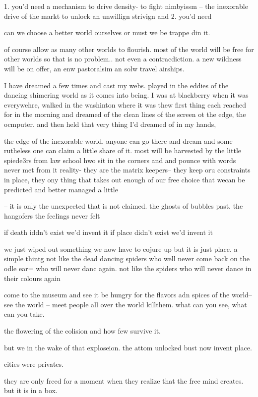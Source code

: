 1. you'd need a mechanism to drive density- to fight nimbyissm -- the inexorable drive of the markt to unlock an unwillign strivign 
and 
2. you'd need

can we choose a better world ourselves or must we be trappe din it.

of course allow as many other worlds to flourish. most of the world will be free for other worlds so that is no problem.. not even a contracdiction. a new wildness will be on offer, an enw pastoralsim an solw travel airships. 

I have dreamed a few times and cast my webs. played in the eddies of the dancing shimering world as it comes into being. I was at blackberry when it was everywehre, walked in the washinton where it was thew first thing each reached for in the morning and dreamed of the clean lines of the screen ot the edge, the ocmputer. and then held that very thing I'd dreamed of in my hands,

the edge of the inexorable world. anyone can go there and dream and some rutheless one can claim a little share of it.
most will be harvested by the little spiede3rs from law school hwo sit in the corners and and pounce with words never met from it
reality- they are the matrix keepers-- they keep oru constraints in place, they ony thing that takes out enough of our free choice that wecan be predicted and better managed a little

-- it is only the unexpected that is not claimed.
the ghosts of bubbles past.
the hangofers
the feelings never felt

if death iddn't exist we'd invent it
if place didn't exist we'd invent it

we just wiped out something we now have to cojure up but it is just place. a simple thintg not like the dead dancing spiders who well never come back on the odle ear= who will never danc again.
not like the spiders who will never dance in their colours again

come to the museum and see it
be hungry for the flavors adn spices of the world-- see the world -- meet people all over the world killthem.
what can you see, what can you take.

the flowering of the colision
and how few survive it.

but we in the wake of that exploseion. the attom unlocked bust now invent place.

cities were privates.

they are only freed for a moment when they realize that the free mind creates. but it is in a box.

